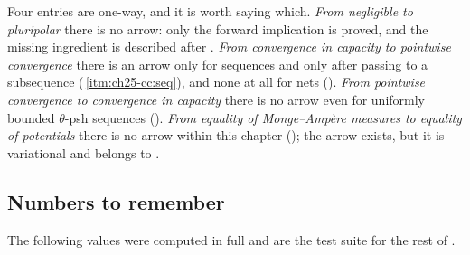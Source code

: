 Four entries are one-way, and it is worth saying which.  \emph{From
negligible to pluripolar} there is no arrow: only the forward implication is
proved, and the missing ingredient is described after
.  \emph{From convergence in capacity to
pointwise convergence} there is an arrow only for sequences and only after
passing to a subsequence
(\,\cref{itm:ch25-cc:seq}), and none at
all for nets ().  \emph{From pointwise
convergence to convergence in capacity} there is no arrow even for uniformly
bounded \(\theta\)-psh sequences
().  \emph{From equality of
Monge--Amp\`ere measures to equality of potentials} there is no arrow within
this chapter (); the arrow exists, but it is
variational and belongs to
.

\subsection{Numbers to remember}
\label{sec:ch25-dict-numbers}

The following values were computed in full and are the test suite for the
rest of .

